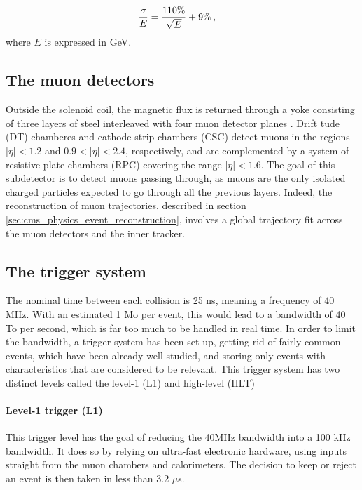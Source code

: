\begin{equation}
    \frac{\sigma}{E} = \frac{110 \%}{\sqrt{E}} + 9\% \msep
\end{equation}
where $E$ is expressed in GeV.
\subsection{The muon detectors}

Outside the solenoid coil, the magnetic flux is returned through a yoke consisting of three layers of steel interleaved with four muon detector planes \cite{CERN-LHCC-97-032,collaboration_2013}. Drift tude (DT) chamberes and cathode strip chambers (CSC) detect muons in the regions $|\eta| < 1.2$ and $0.9 < |\eta| < 2.4$, respectively, and are complemented by a system of resistive plate chambers (RPC) covering the range $|\eta| < 1.6$. The goal of this subdetector is to detect muons passing through, as muons are the only isolated charged particles expected to go through all the previous layers. Indeed, the reconstruction of muon trajectories, described in section \ref{sec:cms_physics_event_reconstruction}, involves a global trajectory fit across the muon detectors and the inner tracker.

\subsection{The trigger system}
\label{sec:trigger}

The nominal time between each collision is 25 ns, meaning a frequency of 40 MHz. With an estimated 1 Mo per event, this would lead to a bandwidth of 40 To per second, which is far too much to be handled in real time. In order to limit the bandwidth, a trigger system has been set up, getting rid of fairly common events, which have been already well studied, and storing only events with characteristics that are considered to be relevant. This trigger system has two distinct levels called the level-1 (L1) and high-level (HLT)

\paragraph{Level-1 trigger (L1)} This trigger level has the goal of reducing the 40MHz bandwidth into a 100 kHz bandwidth. It does so by relying on ultra-fast electronic hardware, using inputs straight from the muon chambers and calorimeters. The decision to keep or reject an event is then taken in less than 3.2 $\mu$s. 

